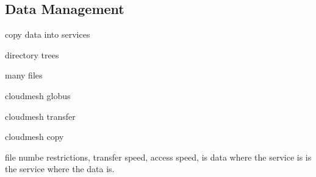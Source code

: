 \subsection{Data Management}
\label{sec:data}

copy data into services

directory trees

many files

cloudmesh globus

cloudmesh transfer

cloudmesh copy

file numbe restrictions, transfer speed, access speed, is data where the service is is the service where the data is.




